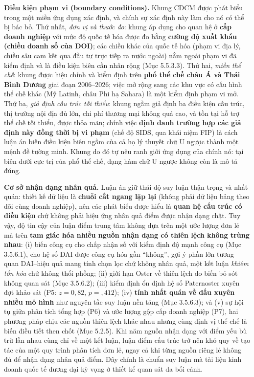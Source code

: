 \documentclass[
  a4paper,
  13pt]{extreport}
\begin{document}
\textbf{Điều kiện phạm vi (boundary conditions).} Khung CDCM được phát
biểu trong một miền ứng dụng xác định, và chính sự xác định này làm cho
nó có thể bị bác bỏ. Thứ nhất, \emph{đơn vị và thước đo}: khung áp dụng
cho quan hệ ở \textbf{cấp doanh nghiệp} với mức độ quốc tế hóa được đo
bằng \textbf{cường độ xuất khẩu (chiều doanh số của DOI)}; các chiều
khác của quốc tế hóa (phạm vi địa lý, chiều sâu cam kết qua đầu tư trực
tiếp ra nước ngoài) nằm ngoài phạm vi đã kiểm định và là điều kiện biên
cần nhân rộng (Mục 5.5.3.3). Thứ hai, \emph{miền thể chế}: khung được
hiệu chỉnh và kiểm định trên \textbf{phổ thể chế châu Á và Thái Bình
Dương} giai đoạn 2006--2026; việc mở rộng sang các khu vực có cấu hình
thể chế khác (Mỹ Latinh, châu Phi hạ Sahara) là một kiểm định phạm vi
mở. Thứ ba, \emph{giả định cấu trúc tối thiểu}: khung ngầm giả định ba
điều kiện cấu trúc, thị trường nội địa đủ lớn, chi phí thương mại không
quá cao, và tồn tại hỗ trợ thể chế tối thiểu, được thỏa mãn; chính việc
\textbf{định danh trường hợp các giả định này đồng thời bị vi phạm} (chế
độ SIDS, qua khái niệm FIP) là cách luận án biến điều kiện biên ngầm của
cả họ lý thuyết chữ U ngược thành một mệnh đề tường minh. Khung do đó tự
nêu ranh giới ứng dụng của chính nó: tại biên dưới cực trị của phổ thể
chế, dạng hàm chữ U ngược không còn là mô tả đúng.

\textbf{Cơ sở nhận dạng nhân quả.} Luận án giữ thái độ suy luận thận
trọng và nhất quán: thiết kế dữ liệu là \textbf{chuỗi cắt ngang lặp lại}
(không phải dữ liệu bảng theo dõi cùng doanh nghiệp), nên các phát biểu
được hiểu là \textbf{quan hệ cấu trúc có điều kiện} chứ không phải hiệu
ứng nhân quả điểm được nhận dạng chặt. Tuy vậy, độ tin cậy của luận điểm
trung tâm không dựa trên một ước lượng đơn lẻ mà trên \textbf{tam giác
hóa nhiều nguồn nhận dạng có thiên lệch không trùng nhau}: (i) biến công
cụ cho chấp nhận số với kiểm định độ mạnh công cụ (Mục 3.5.6.1), cho hệ
số DAI được công cụ hóa gần ``không'', gợi ý phần lớn tương quan
DAI--hiệu quả mang tính chọn lọc chứ không nhân quả, một kết luận
\emph{khiêm tốn hóa} chứ không thổi phồng; (ii) giới hạn Oster về thiên
lệch do biến bỏ sót không quan sát (Mục 3.5.6.2); (iii) kiểm định ổn
định hệ số Paternoster xuyên đợt khảo sát (P5: \(z=0{,}82\),
\(p=,412\)); (iv) \textbf{tính nhất quán về dấu xuyên nhiều mô hình} như
nguyên tắc suy luận nền tảng (Mục 3.5.6.3); và (v) sự hội tụ giữa phân
tích tổng hợp (P6) và ước lượng gộp cấp doanh nghiệp (P7), hai phương
pháp chịu các nguồn thiên lệch khác nhau nhưng cùng định vị thể chế là
biến điều tiết then chốt (Mục 5.2.5). Khi năm nguồn nhận dạng với điểm
yếu bù trừ lẫn nhau cùng chỉ về một kết luận, luận điểm cấu trúc trở nên
khó quy về tạo tác của một quy trình phân tích đơn lẻ, ngay cả khi từng
nguồn riêng lẻ không đủ để nhận dạng nhân quả điểm. Đây chính là chuẩn
suy luận mà tài liệu kinh doanh quốc tế đương đại kỳ vọng ở thiết kế
quan sát đa bối cảnh.
\end{document}
